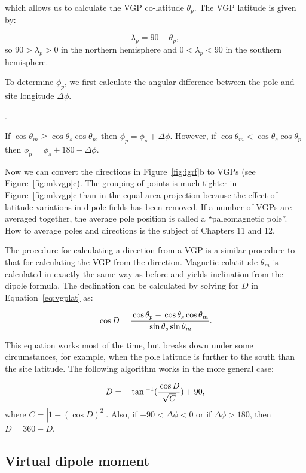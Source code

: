 \noindent which allows us to calculate the VGP co-latitude $\theta_p$. The
VGP latitude is given by:

$$
\lambda_p = 90 - \theta_p,
$$
\noindent so $90>\lambda_p>0$ in the northern hemisphere and
$0<\lambda_p<90$ in the southern hemisphere.
 
To determine $\phi_p$, we first calculate the angular difference between
the pole and site
longitude $\Delta \phi$.  
 
  .
\label{eq:vgplong}
\eeq
 
\noindent  If $\cos \theta_m
\geq \cos \theta_s \cos \theta_p$, then $\phi_p = \phi_s+\Delta \phi$.
However, if $\cos \theta_m <
\cos \theta_s \cos \theta_p$ then
$\phi_p=\phi_s + 180 -\Delta \phi$.


Now we can convert the directions in
Figure~\ref{fig:igrf}b to 
%
VGPs (see Figure~\ref{fig:mkvgp}c).  The grouping 
of points is much tighter in Figure~\ref{fig:mkvgp}c than in the
equal area projection because the effect
of latitude variations in dipole fields has been removed.    
If a number of VGPs are averaged together, the average pole position is called a ``paleomagnetic pole''.  How to average poles and directions is the subject of Chapters 11 and 12.

The procedure for calculating a direction from a VGP is a similar procedure to that for calculating the VGP from the direction.    
Magnetic colatitude $\theta_m$ is calculated in exactly the same way as before and yields inclination from the dipole formula.   The declination can be calculated  by solving for $D$ in Equation~\ref{eq:vgplat} as:

$$
\cos D = { { \cos \theta_p - \cos \theta_s \cos \theta_m} \over { \sin \theta_s \sin \theta_m} }.
$$

\noindent
This equation works most of the time, but breaks down under some circumstances, for example, when the pole latitude is further to the south than the site latitude.   The following algorithm works in the more general case:



$$
D= - \tan^{-1} (  { { \cos D}\over { \sqrt{ C}  } }) + 90,
$$
\noindent where $C = |1- (\cos D)^2|$.     Also, if  $-90 < \Delta \phi <0$ or if $ \Delta \phi > 180$, then $D = 360 - D$.       
 
%
\subsection {Virtual dipole moment}
\label{sect:vdm}

